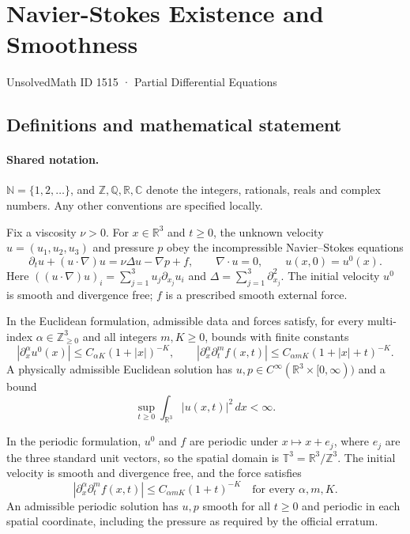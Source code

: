 \documentclass[11pt]{article}
\begin{document}
\setcounter{section}{1514}
\section{Navier-Stokes Existence and Smoothness}\label{1515}
{\small\sffamily UnsolvedMath ID 1515 · Partial Differential Equations}
\subsection{Definitions and mathematical statement}

\paragraph{Shared notation.}$\mathbb N=\{1,2,\ldots\}$, and $\mathbb Z,\mathbb Q,\mathbb R,\mathbb C$ denote the integers, rationals, reals and complex numbers. Any other conventions are specified locally.


Fix a viscosity \(\nu>0\). For \(x\in\mathbb R^3\) and \(t\ge0\),
the unknown velocity \(u=(u_1,u_2,u_3)\) and pressure \(p\)
obey the incompressible Navier--Stokes equations
\[
 \partial_tu+(u\cdot\nabla)u=\nu\Delta u-\nabla p+f,
 \qquad \nabla\cdot u=0,
 \qquad u(x,0)=u^0(x).
\]
Here \(((u\cdot\nabla)u)_i=\sum_{j=1}^3u_j\partial_{x_j}u_i\)
and \(\Delta=\sum_{j=1}^3\partial_{x_j}^2\).
The initial velocity \(u^0\) is smooth and divergence free; \(f\)
is a prescribed smooth external force.

In the Euclidean formulation, admissible data and forces satisfy,
for every multi-index \(\alpha\in\mathbb Z_{\ge0}^3\) and all integers
\(m,K\ge0\), bounds with finite constants
\[
 |\partial_x^\alpha u^0(x)|\le C_{\alpha K}(1+|x|)^{-K},\qquad
 |\partial_x^\alpha\partial_t^mf(x,t)|
       \le C_{\alpha mK}(1+|x|+t)^{-K}.
\]
A physically admissible Euclidean solution has
\(u,p\in C^\infty(\mathbb R^3\times[0,\infty))\) and a bound
\[
                     \sup_{t\ge0}\int_{\mathbb R^3}|u(x,t)|^2\,dx<\infty.
\]

In the periodic formulation, \(u^0\) and \(f\) are periodic
under \(x\mapsto x+e_j\), where \(e_j\) are the three standard unit
vectors, so the spatial domain is \(\mathbb T^3=\mathbb R^3/\mathbb Z^3\).
The initial velocity is smooth and divergence free, and the force satisfies
\[
 |\partial_x^\alpha\partial_t^mf(x,t)|
       \le C_{\alpha mK}(1+t)^{-K}
                       \quad\text{for every }\alpha,m,K.
\]
An admissible periodic solution has \(u,p\) smooth for all \(t\ge0\)
and periodic in each spatial coordinate, including the pressure as required
by the official erratum.
\end{document}
